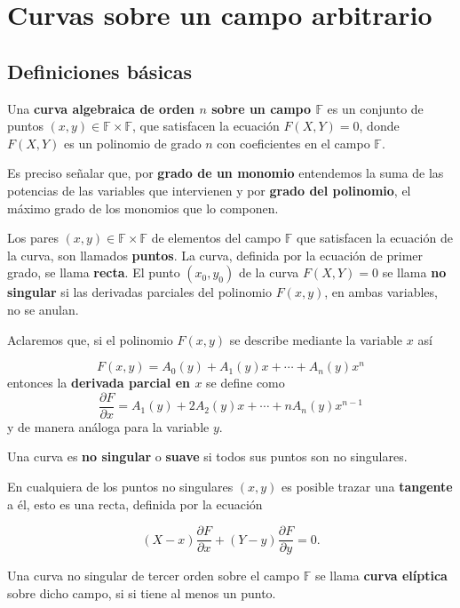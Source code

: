 \documentclass[12pt,oneside]{book}
\begin{document}
\section{Curvas sobre un campo arbitrario}

\subsection{Definiciones b\'asicas}

\begin{defi}
Una \textbf{curva algebraica de orden $n$ sobre un campo $\mathbb{F}$} es un conjunto de puntos $(x,y)\in \mathbb{F}\times\mathbb{F}$, que satisfacen la ecuaci\'on $F(X,Y)=0$, donde $F(X,Y)$ es un polinomio de grado $n$ con coeficientes en el campo $\mathbb{F}$.
\end{defi}

Es preciso se\~nalar que, por \textbf{grado de un monomio} entendemos la suma de las potencias de las variables que intervienen y por \textbf{grado del polinomio}, el m\'aximo grado de los monomios que lo componen.

Los pares $(x,y)\in \mathbb{F}\times\mathbb{F}$ de elementos del campo $\mathbb{F}$ que satisfacen la ecuaci\'on de la curva, son llamados \textbf{puntos}. La curva, definida por la ecuaci\'on de primer grado, se llama \textbf{recta}. El punto $(x_0,y_0)$ de la curva $F(X,Y)=0$ se llama \textbf{no singular} si las derivadas parciales del polinomio $F(x,y)$, en ambas variables, no se anulan.

Aclaremos que, si el polinomio $F(x,y)$ se describe mediante la variable $x$ as\'i

$$F(x,y)=A_0(y)+A_1(y)x+\cdots+A_n(y)x^n$$
entonces la \textbf{derivada parcial en $x$} se define como
$$\frac{\partial F}{\partial x} = A_1(y)+2A_2(y)x+\cdots+nA_n(y)x^{n-1}$$
  y de manera an\'aloga para la variable $y$. 
  
\begin{defi}
Una curva es \textbf{no singular} o \textbf{suave} si todos sus puntos son no singulares.
\end{defi}

En cualquiera de los puntos no singulares $(x,y)$ es posible trazar una \textbf{tangente} a \'el, esto es una recta, definida por la ecuaci\'on

$$(X-x)\frac{\partial F}{\partial x}+(Y-y)\frac{\partial F}{\partial y}=0.$$

\begin{defi}
Una curva no singular de tercer orden sobre el campo $\mathbb{F}$ se llama \textbf{curva el\'iptica} sobre dicho campo, si si tiene al menos un punto.
\end{defi}
\end{document}
